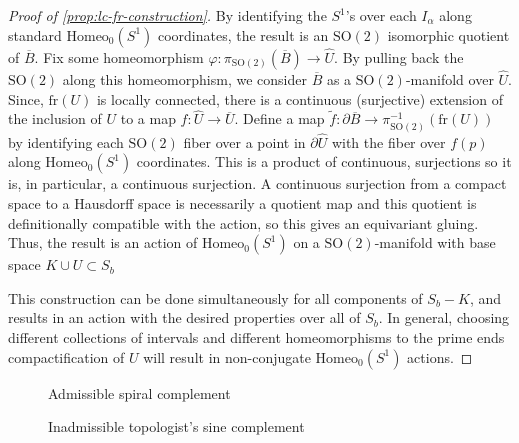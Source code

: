 \documentclass[10pt, oneside]{article}
\newcommand{\SO}[1][2]{\text{SO}(#1)}
\newcommand{\homeo}[1][S^1]{\text{Homeo}_0(#1)}
\newcommand{\cl}[1]{\overline{#1}}
\newcommand{\fr}[1]{\text{fr}(#1)}
\theoremstyle{definition}
\newtheorem{prop}{Proposition}[section]
\theoremstyle{definition}
\begin{document}
\begin{proof}[Proof of \cref{prop:lc-fr-construction}]
    By identifying the $S^1$'s over each $I_\alpha$ along standard $\homeo$ coordinates, the result is an $\SO$ isomorphic quotient of $\cl{B}$. Fix some homeomorphism $\varphi: \pi_{\SO}(\cl{B}) \to \hat{U}$. By pulling back the $\SO$ along this homeomorphism, we consider $\cl{B}$ as a $\SO$-manifold over $\hat{U}$. Since, $\fr{U}$ is locally connected, there is a continuous (surjective) extension of the inclusion of $U$ to a map $f:\hat{U}\to \cl{U}$\cite{mather:TopologicalProofs}. Define a map $\tilde{f}:\partial\cl{B}\to\pi_{\SO}^{-1}(\fr{U})$ by identifying each $\SO$ fiber over a point in $\partial\hat{U}$ with the fiber over $f(p)$ along $\homeo$ coordinates. This is a product of continuous, surjections so it is, in particular, a continuous surjection. A continuous surjection from a compact space to a Hausdorff space is necessarily a quotient map and this quotient is definitionally compatible with the action, so this gives an equivariant gluing. Thus, the result is an action of $\homeo$ on a $\SO$-manifold with base space $K\cup U\subset S_b$

    This construction can be done simultaneously for all components of $S_b - K$, and results in an action with the desired properties over all of $S_b$. In general, choosing different collections of intervals and different homeomorphisms to the prime ends compactification of $U$ will result in non-conjugate $\homeo$ actions.
\end{proof}
\begin{figure}[t]
\centering
\begin{minipage}{.5\textwidth}
    \centering
    
    \caption{Admissible spiral complement}
    \label{fig:admissible-spiral}
\end{minipage}%
\begin{minipage}{.5\textwidth}
    \centering
    
    \caption{Inadmissible topologist's sine complement}
    \label{fig:inadmissible-top-sin}
\end{minipage}
\end{figure}



\end{document}
